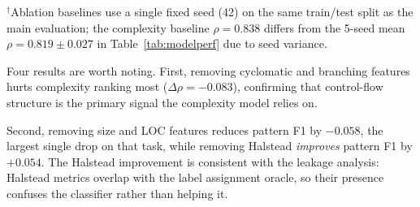 \documentclass[12pt, oneside]{report}
\begin{document}
\begin{table}[H]
\centering
\caption{Feature ablation results: change from full-model baseline.}
\label{tab:ablation}
\begin{flushleft}\small $^\dagger$Ablation baselines use a single fixed seed (42) on the same train/test split as the main evaluation; the complexity baseline $\rho = 0.838$ differs from the 5-seed mean $\rho = 0.819 \pm 0.027$ in Table~\ref{tab:modelperf} due to seed variance.\end{flushleft}
\end{table}

Four results are worth noting. First, removing cyclomatic and branching features hurts
complexity ranking most ($\Delta\rho = -0.083$), confirming that control-flow
structure is the primary signal the complexity model relies on.

Second, removing size and LOC features reduces pattern F1 by $-0.058$, the largest single drop on that task, while removing Halstead \textit{improves} pattern F1 by
$+0.054$. The Halstead improvement is consistent with the leakage analysis: Halstead
metrics overlap with the label assignment oracle, so their presence confuses the
classifier rather than helping it.
\end{document}
